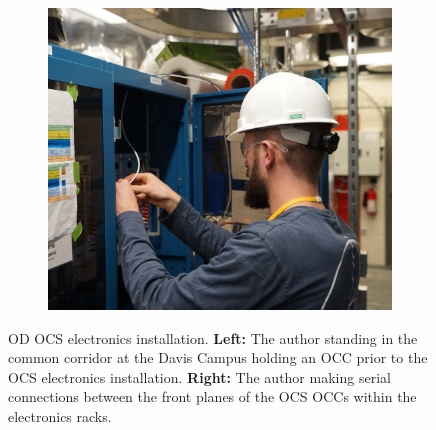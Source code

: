 \begin{figure}
\begin{subfigure}{0.47\textwidth}
         \includegraphics[width=\textwidth]{figures/LZ/OCSElectronicsInstallation.png}
         \label{fig:Gonk1}
     \end{subfigure}
     \caption{OD OCS electronics installation. \textbf{Left:} The author standing in the common corridor at the Davis Campus holding an OCC prior to the OCS electronics installation. \textbf{Right:} The author making serial connections between the front planes of the OCS OCCs within the electronics racks.}
\end{figure}